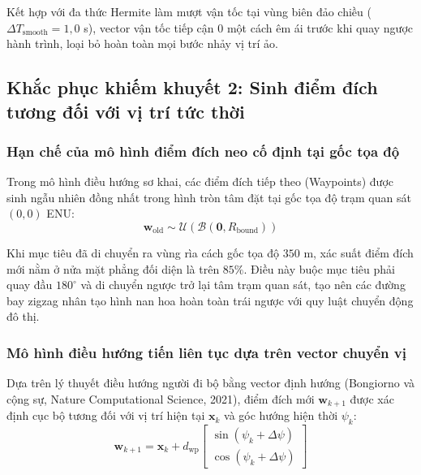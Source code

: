 Kết hợp với đa thức Hermite làm mượt vận tốc tại vùng biên đảo chiều ($\Delta T_{\text{smooth}} = 1{,}0$ s), vector vận tốc tiếp cận 0 một cách êm ái trước khi quay ngược hành trình, loại bỏ hoàn toàn mọi bước nhảy vị trí ảo.

\subsection{Khắc phục khiếm khuyết 2: Sinh điểm đích tương đối với vị trí tức thời}

\subsubsection{Hạn chế của mô hình điểm đích neo cố định tại gốc tọa độ}

\hspace{0.5cm} Trong mô hình điều hướng sơ khai, các điểm đích tiếp theo (Waypoints) được sinh ngẫu nhiên đồng nhất trong hình tròn tâm đặt tại gốc tọa độ trạm quan sát $(0, 0)$ ENU:
\begin{equation}
\mathbf{w}_{\text{old}} \sim \mathcal{U}(\mathcal{B}(\mathbf{0}, R_{\text{bound}}))
\label{eq:origin-anchored-waypoint}
\end{equation}

Khi mục tiêu đã di chuyển ra vùng rìa cách gốc tọa độ $350$ m, xác suất điểm đích mới nằm ở nửa mặt phẳng đối diện là trên $85\%$. Điều này buộc mục tiêu phải quay đầu $180^\circ$ và di chuyển ngược trở lại tâm trạm quan sát, tạo nên các đường bay zigzag nhân tạo hình nan hoa hoàn toàn trái ngược với quy luật chuyển động đô thị.

\subsubsection{Mô hình điều hướng tiến liên tục dựa trên vector chuyển vị}

\hspace{0.5cm} Dựa trên lý thuyết điều hướng người đi bộ bằng vector định hướng (Bongiorno và cộng sự, Nature Computational Science, 2021), điểm đích mới $\mathbf{w}_{k+1}$ được xác định cục bộ tương đối với vị trí hiện tại $\mathbf{x}_k$ và góc hướng hiện thời $\psi_k$:
\begin{equation}
\mathbf{w}_{k+1} = \mathbf{x}_k + d_{\text{wp}} \begin{bmatrix} \sin(\psi_k + \Delta\psi) \\ \cos(\psi_k + \Delta\psi) \end{bmatrix}
\label{eq:relative-forward-waypoint}
\end{equation}

